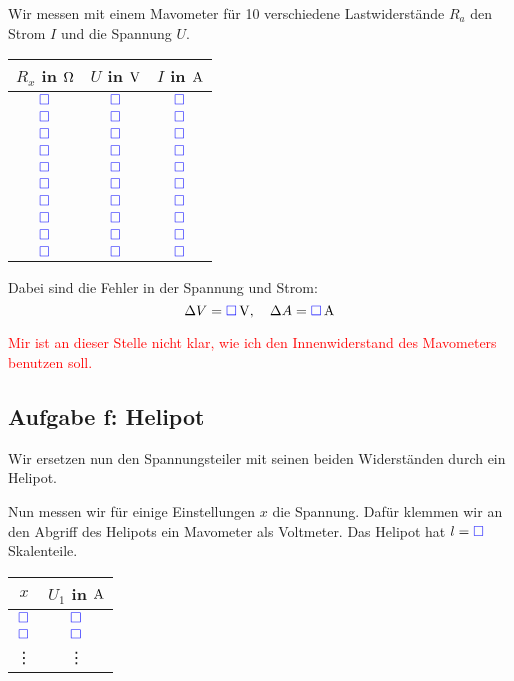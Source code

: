 \documentclass[11pt, ngerman]{article}
\newcommand{\messwert}{\textcolor{blue}{\square}}
\begin{document}
Wir messen mit einem Mavometer für 10 verschiedene Lastwiderstände $R_a$ den
Strom $I$ und die Spannung $U$.

\begin{center}
	\begin{tabular}{ccc}
		$R_x$ in $\unit \Omega$ & $U$ in $\unit V$ & $I$ in $\unit A$ \\
		\hline
		$\messwert$ & $\messwert$ & $\messwert$ \\
		$\messwert$ & $\messwert$ & $\messwert$ \\
		$\messwert$ & $\messwert$ & $\messwert$ \\
		$\messwert$ & $\messwert$ & $\messwert$ \\
		$\messwert$ & $\messwert$ & $\messwert$ \\
		$\messwert$ & $\messwert$ & $\messwert$ \\
		$\messwert$ & $\messwert$ & $\messwert$ \\
		$\messwert$ & $\messwert$ & $\messwert$ \\
		$\messwert$ & $\messwert$ & $\messwert$ \\
		$\messwert$ & $\messwert$ & $\messwert$
	\end{tabular}
\end{center}

Dabei sind die Fehler in der Spannung und Strom:
\[ \Delta V = \unit[\messwert]V, \quad \Delta A = \unit[\messwert] A \]

\textcolor{red}{Mir ist an dieser Stelle nicht klar, wie ich den
Innenwiderstand des Mavometers benutzen soll.}

\subsection{Aufgabe f: Helipot}

\label{durchführung-f}

Wir ersetzen nun den Spannungsteiler mit seinen beiden Widerständen durch ein
Helipot.

Nun messen wir für einige Einstellungen $x$ die Spannung. Dafür klemmen wir an
den Abgriff des Helipots ein Mavometer als Voltmeter. Das Helipot hat $l =
\messwert$ Skalenteile.

\begin{center}
	\begin{tabular}{cc}
		$x$ & $U_1$ in $\unit A$ \\
		\hline
		$\messwert$ & $\messwert$ \\
		$\messwert$ & $\messwert$ \\
			 \vdots & \vdots
	\end{tabular}
\end{center}
\end{document}
